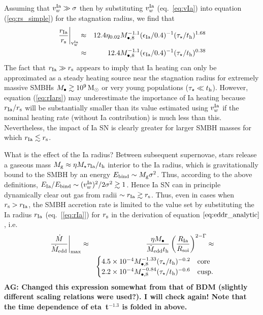 \documentclass[usenatbib,fleqn]{mn2e}
\newcommand{\Mbheight}{M_{\bullet,8}}
\begin{document}
Assuming that $v_{w}^{\rm Ia} \gg \sigma$ then by substituting $v_{w}^{\rm Ia}$ (eq.~\ref{eq:vIa}) into equation (\ref{eq:rs_simple}) for the stagnation radius, we find that
\begin{eqnarray}
\left.\frac{r_{\rm Ia}}{r_{\rm s}}\right|_{\rm v_{w}^{\rm Ia}} &\approx& 12.4\eta_{0.02} M_{\bullet,8}^{-1.1}(\epsilon_{\rm Ia}/0.4)^{-1}(\tau_{\star}/t_{\rm h})^{1.68} \nonumber \\
&\approx& 12.4M_{\bullet,8}^{-1.1}(\epsilon_{\rm Ia}/0.4)^{-1}(\tau_{\star}/t_{\rm h})^{0.38}
\label{eq:rIars}
\end{eqnarray}
The fact that $r_{\rm Ia} \gg r_{\rm s}$ appears to imply that Ia heating can only be approximated as a steady heating source near the stagnation radius for extremely massive SMBHs $M_{\bullet} \gtrsim 10^9 \,{\rm M_\odot}$ or very young populations ($\tau_{\star} \ll t_{\rm h}$).  However, equation (\ref{eq:rIars}) may underestimate the importance of Ia heating because $r_{\rm Ia}/r_{\rm s}$ will be substantially smaller than its value estimated using $v_{w}^{\rm Ia}$ if the nominal heating rate (without Ia contribution) is much less than this.  Nevertheless, the impact of Ia SN is clearly greater for larger SMBH masses for which $r_{\rm Ia} \lesssim r_{\rm s}$.

What is the effect of the Ia radius?  Between subsequent supernovae, stars release a gaseous mass $M_{\rm g} \approx \eta M_{\star}\tau_{\rm Ia}/t_{\rm h}$ interior to the Ia radius, which is gravitationally bound to the SMBH by an energy $E_{\rm bind} \sim M_{\rm g}\sigma^{2}$.  Thus, according to the above definitions, $E_{\rm Ia}/E_{\rm bind} \sim (v_{w}^{\rm Ia})^{2}/2\sigma^{2} \gtrsim 1$.  Hence Ia SN can in principle dynamically clear out gas from radii $\sim r_{\rm Ia} \gtrsim r_{\rm s}$.  Thus, even in cases when $r_{\rm s} > r_{\rm Ia}$, the SMBH accretion rate is limited to the value set by substituting the Ia radius $r_{\rm Ia}$ (eq.~[\ref{eq:rIa}]) for $r_{\rm s}$ in the derivation of equation $\ref{eq:eddr_analytic}$, i.e.  
\begin{eqnarray}
\left.\frac{\dot{M}}{\dot{M}_{\rm edd}}\right|_{\rm max} &\approx& \frac{\eta M_{\bullet}}{\dot{M}_{\rm edd} t_{\rm h}}\left(\frac{R_{\rm Ia}}{R_{\rm soi}}\right)^{2-\Gamma} \approx \nonumber \\
 && \begin{cases}
    4.5 \times 10^{-4} M_{\bullet,8}^{-1.33}(\tau_{\star}/t_{\rm h})^{-0.2}
   & \text{core} \\
    2.2 \times 10^{-4} \Mbheight^{-0.84}(\tau_{\star}/t_{\rm h})^{-0.6}   & \text{cusp}.
  \end{cases}
  \label{eq:eddr_Ia}
\end{eqnarray}
{\bf AG: Changed this expression somewhat from that of BDM (slightly
  different scaling relations were used?). I will
  check again! Note that the time dependence of eta~t$^{-1.3}$ is
  folded in above.}
\end{document}
